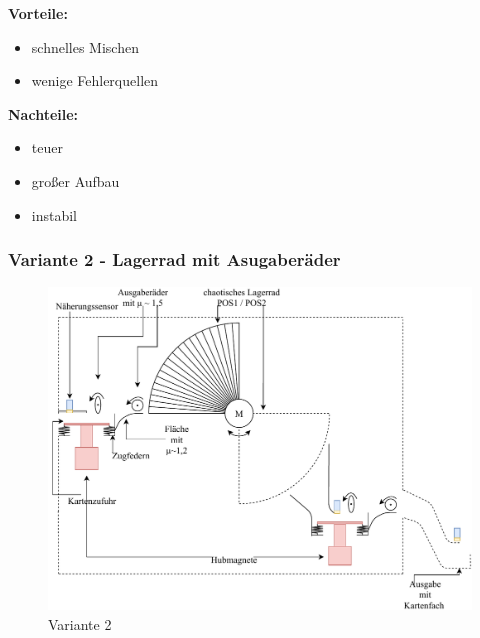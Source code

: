 \textbf{Vorteile:}
\begin{itemize}
    \item schnelles Mischen
    \item wenige Fehlerquellen
\end{itemize}
\textbf{Nachteile:}
\begin{itemize}
    \item teuer
    \item großer Aufbau %
    \item instabil
\end{itemize}

\subsubsection{Variante 2 - Lagerrad mit Asugaberäder}

\begin{figure}[hb]
    \centering
    \includegraphics[scale=0.5,page=1]{fig/mech/Version2}
    \caption{Variante 2}
\end{figure}

